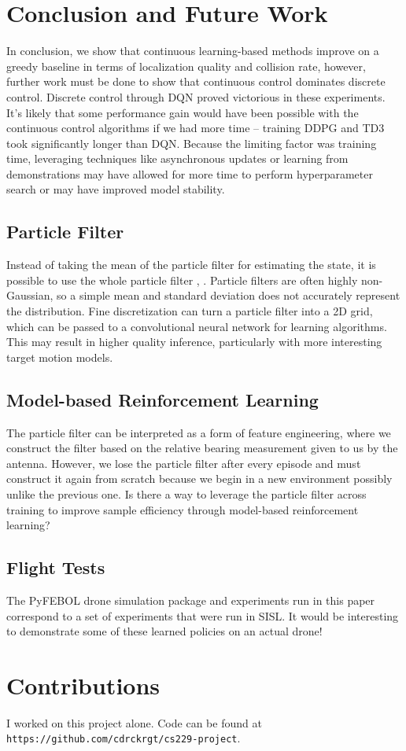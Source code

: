 \documentclass[10pt,twocolumn,letterpaper]{article}
\begin{document}
\section{Conclusion and Future Work}
In conclusion, we show that continuous learning-based methods improve on a greedy baseline in terms of localization quality and collision rate, however, further work must be done to show that continuous control dominates discrete control.
Discrete control through DQN proved victorious in these experiments.
It's likely that some performance gain would have been possible with the continuous control algorithms if we had more time -- training DDPG and TD3 took significantly longer than DQN.
Because the limiting factor was training time, leveraging techniques like asynchronous updates \cite{a3c} or learning from demonstrations \cite{dqfd} may have allowed for more time to perform hyperparameter search or may have improved model stability.

\subsection{Particle Filter}
Instead of taking the mean of the particle filter for estimating the state, it is possible to use the whole particle filter \cite{dronehunter}, \cite{kyle1}.
Particle filters are often highly non-Gaussian, so a simple mean and standard deviation does not accurately represent the distribution.
Fine discretization can turn a particle filter into a 2D grid, which can be passed to a convolutional neural network for learning algorithms.
This may result in higher quality inference, particularly with more interesting target motion models.

\subsection{Model-based Reinforcement Learning}
The particle filter can be interpreted as a form of feature engineering, where we construct the filter based on the relative bearing measurement given to us by the antenna.
However, we lose the particle filter after every episode and must construct it again from scratch because we begin in a new environment possibly unlike the previous one.
Is there a way to leverage the particle filter across training to improve sample efficiency through model-based reinforcement learning?

\subsection{Flight Tests}
The PyFEBOL drone simulation package and experiments run in this paper correspond to a set of experiments that were run in SISL.
It would be interesting to demonstrate some of these learned policies on an actual drone!


\section{Contributions}
I worked on this project alone.
Code can be found at \texttt{https://github.com/cdrckrgt/cs229-project}.

{\small


}
\end{document}
